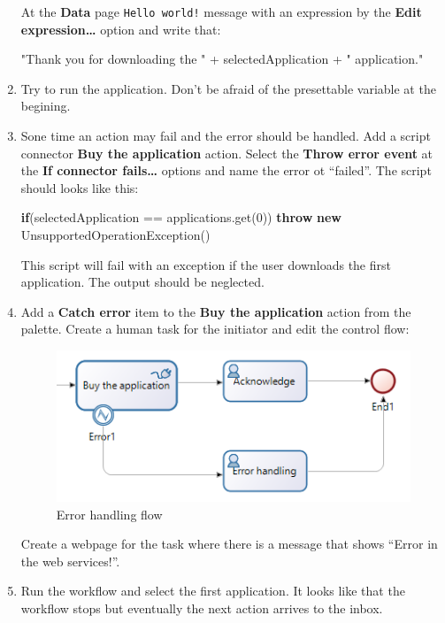 \documentclass[]{report}
\newenvironment{Shaded}{}{}
\newcommand{\KeywordTok}[1]{\textcolor[rgb]{0.00,0.44,0.13}{\textbf{{#1}}}}
\newcommand{\DecValTok}[1]{\textcolor[rgb]{0.25,0.63,0.44}{{#1}}}
\newcommand{\StringTok}[1]{\textcolor[rgb]{0.25,0.44,0.63}{{#1}}}
\newcommand{\FunctionTok}[1]{\textcolor[rgb]{0.02,0.16,0.49}{{#1}}}
\newcommand{\NormalTok}[1]{{#1}}
\let\Oldincludegraphics\includegraphics
\renewcommand{\includegraphics}[1]{
\begin{adjustbox}{max size={\textwidth}{\textheight}}
    \Oldincludegraphics[scale=0.6]{#1}%
\end{adjustbox}
}
\begin{document}
\begin{enumerate}
  At the \textbf{Data} page \texttt{Hello world!} message with an
  expression by the \textbf{Edit expression\ldots{}} option and write
  that:

\begin{Shaded}
\begin{Highlighting}[]
\StringTok{"Thank you for downloading the "} \NormalTok{+ selectedApplication + }\StringTok{" application."}
\end{Highlighting}
\end{Shaded}
\item
  Try to run the application. Don't be afraid of the presettable
  variable at the begining.
\item
  Sone time an action may fail and the error should be handled. Add a
  script connector \textbf{Buy the application} action. Select the
  \textbf{Throw error event} at the \textbf{If connector fails\ldots{}}
  options and name the error ot ``failed''. The script should looks like
  this:

\begin{Shaded}
\begin{Highlighting}[]
\KeywordTok{if}\NormalTok{(selectedApplication == applications.}\FunctionTok{get}\NormalTok{(}\DecValTok{0}\NormalTok{))}
  \KeywordTok{throw} \KeywordTok{new} \NormalTok{UnsupportedOperationException()}
\end{Highlighting}
\end{Shaded}

  This script will fail with an exception if the user downloads the
  first application. The output should be neglected.
\item
  Add a \textbf{Catch error} item to the \textbf{Buy the application}
  action from the palette. Create a human task for the initiator and
  edit the control flow:

  \begin{figure}[htbp]
  \centering
  \includegraphics{img/bpmn/bonita_error_handling.png}
  \caption{Error handling flow}
  \end{figure}

  Create a webpage for the task where there is a message that shows
  ``Error in the web services!''.
\item
  Run the workflow and select the first application. It looks like that
  the workflow stops but eventually the next action arrives to the
  inbox.
\end{enumerate}
\end{document}
